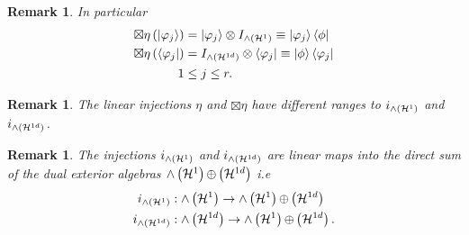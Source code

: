 \documentclass[aps,preprint]{revtex4}%
\newtheorem{remark}[theorem]{Remark}
\begin{document}
\begin{remark}
In particular%
\begin{align}
\boxtimes\eta\left(  \left\vert \varphi_{j}\right\rangle \right)   &
=\left\vert \varphi_{j}\right\rangle \otimes I_{{\huge \wedge}\left(
\mathcal{H}^{1}\right)  }\equiv\left\vert \varphi_{j}\right\rangle
\left\langle \phi\right\vert \\
\boxtimes\eta\left(  \left\langle \varphi_{j}\right\vert \right)   &
=I_{{\huge \wedge}\left(  \mathcal{H}^{1d}\right)  }\otimes\left\langle
\varphi_{j}\right\vert \equiv\left\vert \phi\right\rangle \left\langle
\varphi_{j}\right\vert \\
1  &  \leq j\leq r.
\end{align}

\end{remark}

\begin{remark}
The linear injections $\eta$ and $\boxtimes\eta$ have \emph{different ranges
to} $i_{{\huge \wedge}\left(  \mathcal{H}^{1}\right)  }$ and $i_{{\huge \wedge
}\left(  \mathcal{H}^{1d}\right)  }$.
\end{remark}

\begin{remark}
The injections $i_{{\huge \wedge}\left(  \mathcal{H}^{1}\right)  }$ and
$i_{{\huge \wedge}\left(  \mathcal{H}^{1d}\right)  }$ are linear maps into the
direct sum of the dual exterior algebras ${\huge \wedge}\left(  \mathcal{H}%
^{1}\right)  {\normalsize \oplus}\left(  \mathcal{H}^{1d}\right)  $ i.e
\begin{align}
i_{{\huge \wedge}\left(  \mathcal{H}^{1}\right)  }  &  :{\huge \wedge}\left(
\mathcal{H}^{1}\right)  \rightarrow{\huge \wedge}\left(  \mathcal{H}%
^{1}\right)  {\normalsize \oplus}\left(  \mathcal{H}^{1d}\right) \\
i_{{\huge \wedge}\left(  \mathcal{H}^{1d}\right)  }  &  :{\huge \wedge}\left(
\mathcal{H}^{1d}\right)  \rightarrow{\huge \wedge}\left(  \mathcal{H}%
^{1}\right)  {\normalsize \oplus}\left(  \mathcal{H}^{1d}\right)  .
\end{align}
\emph{ }
\end{remark}
\end{document}
